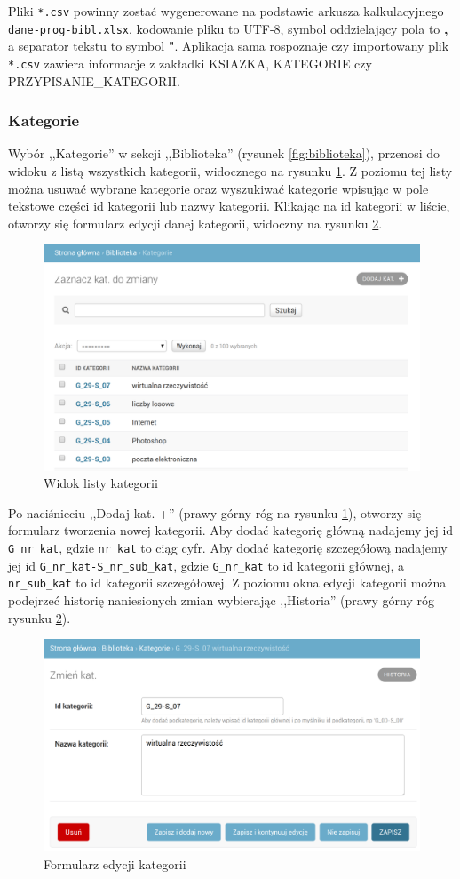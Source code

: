 \documentclass[twoside]{projektInzynierskiMS}
\begin{document}
Pliki \verb`*.csv` powinny zostać wygenerowane na podstawie arkusza kalkulacyjnego \verb`dane-prog-bibl.xlsx`, kodowanie pliku to UTF-8, symbol oddzielający pola to \textbf{,} a separator tekstu to symbol \textbf{"}. Aplikacja sama rospoznaje czy importowany plik \verb`*.csv` zawiera informacje z zakładki KSIAZKA, KATEGORIE czy PRZYPISANIE\_KATEGORII.

\subsubsection{Kategorie}

Wybór ,,Kategorie'' w sekcji ,,Biblioteka'' (rysunek \ref{fig:biblioteka}), przenosi do widoku z listą wszystkich kategorii, widocznego na rysunku \ref{fig:adminAllCategories}. Z poziomu tej listy można usuwać wybrane kategorie oraz wyszukiwać kategorie wpisując w pole tekstowe części id kategorii lub nazwy kategorii. Klikając na id kategorii w liście, otworzy się formularz edycji danej kategorii, widoczny na rysunku \ref{fig:adminEditCategory}. 

\begin{figure}[h]
  \centering
  \includegraphics[width=0.4\linewidth]{img/backend/ListaKategorii.png}
  \caption{Widok listy kategorii}
  \label{fig:adminAllCategories}
\end{figure}

Po naciśnieciu ,,Dodaj kat. +'' (prawy górny róg na rysunku \ref{fig:adminAllCategories}), otworzy się formularz tworzenia nowej kategorii. Aby dodać kategorię główną nadajemy jej id \verb`G_nr_kat`, gdzie \verb`nr_kat` to ciąg cyfr. Aby dodać kategorię szczegółową nadajemy jej id \verb`G_nr_kat-S_nr_sub_kat`, gdzie \verb`G_nr_kat` to id kategorii głównej, a \verb`nr_sub_kat` to id kategorii szczegółowej.
Z poziomu okna edycji kategorii można podejrzeć historię naniesionych zmian wybierając ,,Historia'' (prawy górny róg rysunku \ref{fig:adminEditCategory}).



\begin{figure}[h]
  \centering
  \includegraphics[width=0.4\linewidth]{img/backend/EdycjaKategorii.png}
  \caption{Formularz edycji kategorii}
  \label{fig:adminEditCategory}
\end{figure}
\end{document}
